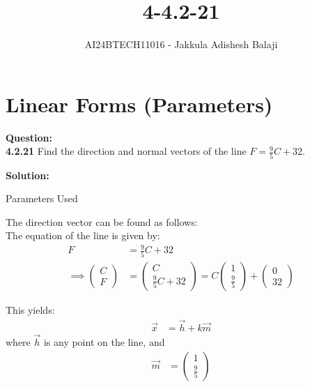 \documentclass[journal]{IEEEtran}
\begin{document}

\setlength{\intextsep}{10pt} %

\title{4-4.2-21}
\author{AI24BTECH11016 - Jakkula Adishesh Balaji}
\maketitle

\section*{\textbf{Linear Forms (Parameters)}}
\parindent 0pt
\textbf{Question:} \\
\textbf{4.2.21} Find the direction and normal vectors of the line \( F = \frac{9}{5}C + 32 \).

\textbf{Solution:}

\begin{table}[h!]    	
    \centering
     
    \caption{Parameters Used}
    \label{tab:1-1.9-6}
\end{table}

The direction vector can be found as follows: \\
The equation of the line is given by:
\begin{align}
	F &= \frac{9}{5}C + 32 \\
	\implies \begin{pmatrix} C \\ F \end{pmatrix} &= \begin{pmatrix} C \\ \frac{9}{5}C + 32 \end{pmatrix} = C \begin{pmatrix} 1 \\ \frac{9}{5} \end{pmatrix} + \begin{pmatrix} 0 \\ 32 \end{pmatrix}
\end{align}

This yields:
\begin{align}
	\vec{x} &= \vec{h} + k\vec{m}
\end{align}
where \(\vec{h}\) is any point on the line, and 
\begin{align}
    \vec{m} &= \begin{pmatrix} 1 \\ \frac{9}{5} \end{pmatrix}
\end{align}
\end{document}

